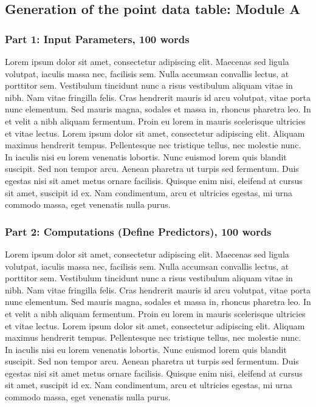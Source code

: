 \documentclass[techmemo]{ecmwfrep}%
\begin{document}
\subsection{Generation of the point data table: Module A}

\subsubsection{Part 1: Input Parameters, 100 words}
Lorem ipsum dolor sit amet, consectetur adipiscing elit. Maecenas sed ligula volutpat, iaculis massa nec, facilisis sem. Nulla accumsan convallis lectus, at porttitor sem. Vestibulum tincidunt nunc a risus vestibulum aliquam vitae in nibh. Nam vitae fringilla felis. Cras hendrerit mauris id arcu volutpat, vitae porta nunc elementum. Sed mauris magna, sodales et massa in, rhoncus pharetra leo. In et velit a nibh aliquam fermentum. Proin eu lorem in mauris scelerisque ultricies et vitae lectus. Lorem ipsum dolor sit amet, consectetur adipiscing elit. Aliquam maximus hendrerit tempus. Pellentesque nec tristique tellus, nec molestie nunc. In iaculis nisi eu lorem venenatis lobortis. Nunc euismod lorem quis blandit suscipit. Sed non tempor arcu. Aenean pharetra ut turpis sed fermentum. Duis egestas nisi sit amet metus ornare facilisis. Quisque enim nisi, eleifend at cursus sit amet, suscipit id ex. Nam condimentum, arcu et ultricies egestas, mi urna commodo massa, eget venenatis nulla purus.




\subsubsection{Part 2: Computations (Define Predictors), 100 words}
Lorem ipsum dolor sit amet, consectetur adipiscing elit. Maecenas sed ligula volutpat, iaculis massa nec, facilisis sem. Nulla accumsan convallis lectus, at porttitor sem. Vestibulum tincidunt nunc a risus vestibulum aliquam vitae in nibh. Nam vitae fringilla felis. Cras hendrerit mauris id arcu volutpat, vitae porta nunc elementum. Sed mauris magna, sodales et massa in, rhoncus pharetra leo. In et velit a nibh aliquam fermentum. Proin eu lorem in mauris scelerisque ultricies et vitae lectus. Lorem ipsum dolor sit amet, consectetur adipiscing elit. Aliquam maximus hendrerit tempus. Pellentesque nec tristique tellus, nec molestie nunc. In iaculis nisi eu lorem venenatis lobortis. Nunc euismod lorem quis blandit suscipit. Sed non tempor arcu. Aenean pharetra ut turpis sed fermentum. Duis egestas nisi sit amet metus ornare facilisis. Quisque enim nisi, eleifend at cursus sit amet, suscipit id ex. Nam condimentum, arcu et ultricies egestas, mi urna commodo massa, eget venenatis nulla purus.
\end{document}

